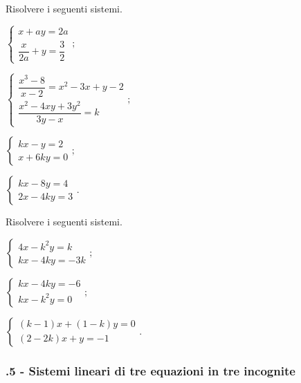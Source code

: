 \begin{esercizio}[\Ast]
 \label{ese:22.55}
Risolvere i seguenti sistemi.
\begin{multicols}{2}
 \begin{enumeratea}
 {\longarray
\item $\left\{\begin{array}{l}x+ay=2a\\\dfrac{x}{2a}+y=\dfrac{3}{2}\end{array}\right.;$
\item $\left\{\begin{array}{l}\dfrac{x^{3}-8}{x-2}=x^{2}-3x+y-2\\\dfrac{x^{2}-4xy+3y^{2}}{3y-x}=k\end{array}\right.;$
\item $\left\{\begin{array}{l}kx-y=2\\x+6ky=0\end{array}\right.;$
\item $\left\{\begin{array}{l}kx-8y=4\\2x-4ky=3\end{array}\right..$}
 \end{enumeratea}
\end{multicols}
\end{esercizio}

\begin{esercizio}[\Ast]
 \label{ese:22.56}
Risolvere i seguenti sistemi.
\begin{multicols}{2}
 \begin{enumeratea}
\item $\left\{\begin{array}{l}4x-k^{2}y=k\\kx-4ky=-3k\end{array}\right.;$
\item $\left\{\begin{array}{l}kx-4ky=-6\\kx-k^{2}y=0\end{array}\right.;$
\item $\left\{\begin{array}{l}(k-1)x+(1-k)y=0\\(2-2k)x+y=-1\end{array}\right..$
 \end{enumeratea}
\end{multicols}
\end{esercizio}

 \subsubsection*{\thechapter.5 - Sistemi lineari di tre equazioni in tre incognite}


